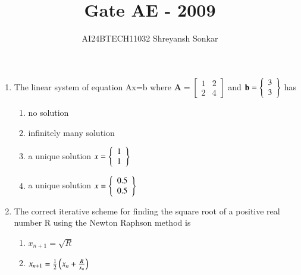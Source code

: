 \documentclass[journal]{IEEEtran}
\begin{document}

\vspace{3cm}


\renewcommand{\thefigure}{\theenumi}
\renewcommand{\thetable}{\theenumi}
\setlength{\intextsep}{10pt} %


\renewcommand{\thetable}{\theenumi}

\title{Gate AE - 2009}
\author{AI24BTECH11032 Shreyansh Sonkar
}
\maketitle
\renewcommand{\thefigure}{\theenumi}
\renewcommand{\thetable}{\theenumi}
\begin{enumerate}[start=49]
\item The linear system of equation Ax=b where $\textbf{A}=\begin{bmatrix}
1 & 2 \\
2 & 4
\end{bmatrix}
$ and $\textbf{b}=\left\{\begin{array}{c}
3 \\
3
\end{array}\right\}
$ has
\begin{multicols}{2}
    \begin{enumerate}
        \item no solution
        \item infinitely many solution
        \item a unique solution $x=\left\{ \begin{array}{c}
                 1 \\1\end{array}\right\}$
        \item a unique solution $x = \left\{ \begin{array}{c}0.5 \\0.5\end{array}\right\}$         
    \end{enumerate}
\end{multicols}
\bigskip
\item The correct iterative scheme for finding the square root of a positive real number R using the Newton Raphson method is
\begin{multicols}{2}
    \begin{enumerate}
        \item $x_{n+1}=\sqrt{R}$
        \item $x_{n+1}=\frac{1}{2}\left(x_{n}+\frac{R}{x_{n}}\right)$

\end{enumerate}
\end{multicols}
\end{enumerate}
\end{document}
